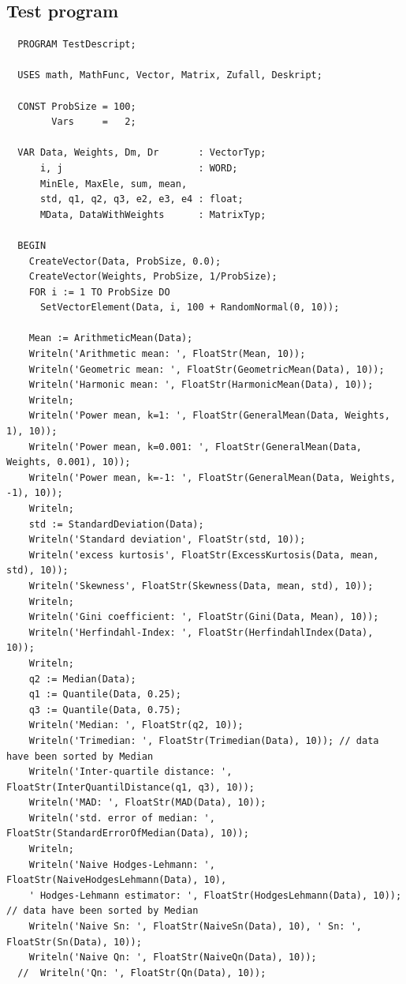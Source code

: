 \begin{refsection}
\section{Test program}

\begin{lstlisting}
  PROGRAM TestDescript;

  USES math, MathFunc, Vector, Matrix, Zufall, Deskript;

  CONST ProbSize = 100;
        Vars     =   2;

  VAR Data, Weights, Dm, Dr       : VectorTyp;
      i, j                        : WORD;
      MinEle, MaxEle, sum, mean,
      std, q1, q2, q3, e2, e3, e4 : float;
      MData, DataWithWeights      : MatrixTyp;

  BEGIN
    CreateVector(Data, ProbSize, 0.0);
    CreateVector(Weights, ProbSize, 1/ProbSize);
    FOR i := 1 TO ProbSize DO
      SetVectorElement(Data, i, 100 + RandomNormal(0, 10));

    Mean := ArithmeticMean(Data);
    Writeln('Arithmetic mean: ', FloatStr(Mean, 10));
    Writeln('Geometric mean: ', FloatStr(GeometricMean(Data), 10));
    Writeln('Harmonic mean: ', FloatStr(HarmonicMean(Data), 10));
    Writeln;
    Writeln('Power mean, k=1: ', FloatStr(GeneralMean(Data, Weights, 1), 10));
    Writeln('Power mean, k=0.001: ', FloatStr(GeneralMean(Data, Weights, 0.001), 10));
    Writeln('Power mean, k=-1: ', FloatStr(GeneralMean(Data, Weights, -1), 10));
    Writeln;
    std := StandardDeviation(Data);
    Writeln('Standard deviation', FloatStr(std, 10));
    Writeln('excess kurtosis', FloatStr(ExcessKurtosis(Data, mean, std), 10));
    Writeln('Skewness', FloatStr(Skewness(Data, mean, std), 10));
    Writeln;
    Writeln('Gini coefficient: ', FloatStr(Gini(Data, Mean), 10));
    Writeln('Herfindahl-Index: ', FloatStr(HerfindahlIndex(Data), 10));
    Writeln;
    q2 := Median(Data);
    q1 := Quantile(Data, 0.25);
    q3 := Quantile(Data, 0.75);
    Writeln('Median: ', FloatStr(q2, 10));
    Writeln('Trimedian: ', FloatStr(Trimedian(Data), 10)); // data have been sorted by Median
    Writeln('Inter-quartile distance: ', FloatStr(InterQuantilDistance(q1, q3), 10));
    Writeln('MAD: ', FloatStr(MAD(Data), 10));
    Writeln('std. error of median: ', FloatStr(StandardErrorOfMedian(Data), 10));
    Writeln;
    Writeln('Naive Hodges-Lehmann: ', FloatStr(NaiveHodgesLehmann(Data), 10),
    ' Hodges-Lehmann estimator: ', FloatStr(HodgesLehmann(Data), 10)); // data have been sorted by Median
    Writeln('Naive Sn: ', FloatStr(NaiveSn(Data), 10), ' Sn: ', FloatStr(Sn(Data), 10));
    Writeln('Naive Qn: ', FloatStr(NaiveQn(Data), 10));
  //  Writeln('Qn: ', FloatStr(Qn(Data), 10));


\end{lstlisting}
\end{refsection}
